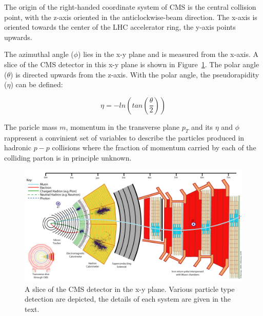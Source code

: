 The origin of the right-handed coordinate system of CMS is the central collision point,
with the z-axis oriented in the anticlockwise-beam direction. The x-axis is oriented
towards the center of the LHC accelerator ring, the y-axis points upwards.

The azimuthal angle ($\phi$) lies in the x-y plane and is measured
from the x-axis. A slice of the CMS detector in this x-y plane is shown in Figure~\ref{fig:CMS_xycut}.
The polar angle ($\theta$) is directed upwards from the z-axis. With the polar angle, the
pseudorapidity ($\eta$) can be defined:

\[
\eta = -ln( tan( \frac{\theta}{2} ) )
\]

The paricle mass $m$, momentum in the transverse plane $p_T$ and its $\eta$ and $\phi$ rappresent a convinient set of
variables to describe the particles produced in hadronic $p-p$ collisions where the fraction
of momentum carried by each of the colliding parton is in principle unknown.

\begin{figure}[!h]
  \includegraphics[width = 1.\textwidth]{figures/cms/CMS_Slice.png}
  \caption{A slice of the CMS detector in the x-y plane. Various particle type detection are depicted, the
    details of each system are given in the text.}
  \label{fig:CMS_xycut}  
\end{figure}


